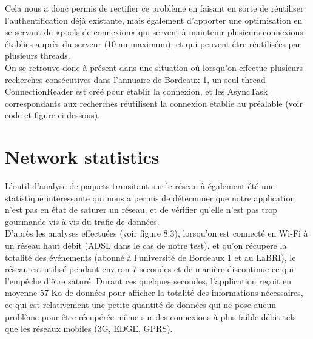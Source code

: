 Cela nous a donc permis de rectifier ce problème en faisant en sorte de réutiliser l’authentification déjà existante, mais également d’apporter une optimisation en se servant de «pools de connexion» qui servent à maintenir plusieurs connexions établies auprès du serveur (10 au maximum),  et qui peuvent être réutilisées par plusieurs threads.\\
On se retrouve donc à présent dans une situation où lorsqu’on effectue plusieurs recherches consécutives dans l’annuaire de Bordeaux 1, un seul thread ConnectionReader est créé pour établir la connexion, et les AsyncTask correspondants aux recherches réutilisent la connexion établie au préalable (voir code et figure ci-dessous).

\begin{figure}[h!]
  \label{fig:with_pool_code}
  \center
  \setlength\fboxsep{5pt}
  \setlength\fboxrule{0.5pt}
\end{figure}

\begin{figure}[h!]
  \label{fig:with_pool}
  \center
  \setlength\fboxsep{5pt}
  \setlength\fboxrule{0.5pt}
\end{figure}

\newpage

\section{Network statistics}
L’outil d’analyse de paquets transitant sur le réseau à également été une statistique intéressante qui nous a permis de déterminer que notre application n’est pas en état de saturer un réseau, et de vérifier qu’elle n’est pas trop gourmande vis à vis du trafic de données.\\
D’après les analyses effectuées (voir figure 8.3), lorsqu’on est connecté en Wi-Fi à un réseau haut débit (ADSL dans le cas de notre test), et qu’on récupère la totalité des événements (abonné à l'université de Bordeaux 1 et au LaBRI), le réseau est utilisé pendant environ 7 secondes et de manière discontinue ce qui l’empêche d’être saturé. Durant ces quelques secondes, l’application reçoit en moyenne 57 Ko de données pour afficher la totalité des informations nécessaires, ce qui est relativement une petite quantité de données qui ne pose aucun problème pour être récupérée même sur des connexions à plus faible débit tels que les réseaux mobiles (3G, EDGE, GPRS). 

